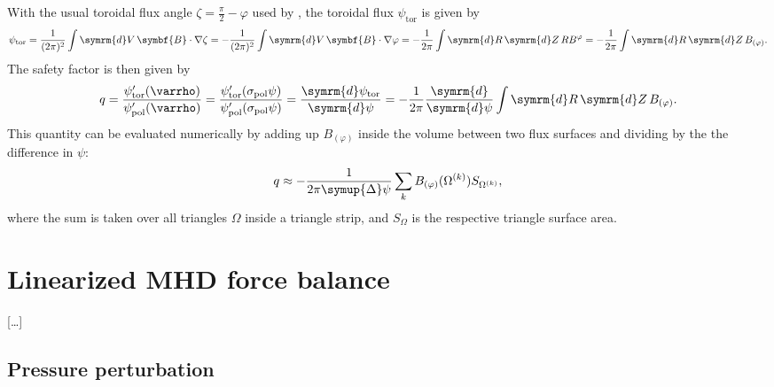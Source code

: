 \documentclass[a4paper, twoside, 10pt, english]{article}
\numberwithin{equation}{section}
\let\temp\varrho
\let\varrho\rho
\let\rho\temp
\let\temp\vartheta
\let\vartheta\theta
\let\theta\temp
\let\temp\varphi
\let\varphi\phi
\let\phi\temp
\let\vec\symbf
\newcommand*\grad{\ensuremath{\nabla}}
\newcommand*\diff{\ensuremath{\symrm{d}}}  %
\newcommand*\td[2][]{\ensuremath{\frac{\diff #1}{\diff #2}}}  %
\newcommand*\pol{\ensuremath{\textrm{pol}}}  %
\newcommand*\tor{\ensuremath{\textrm{tor}}}  %
\begin{document}
With the usual toroidal flux angle $\zeta = \frac{\pi}{2} - \phi$ used by \cite{dHaeseleer91}, the toroidal flux $\psi_{\tor}$ is given by
\begin{gather}
  \psi_{\tor} = \frac{1}{(2 \pi)^{2}} \int \diff V \, \vec{B} \cdot \grad \zeta = -\frac{1}{(2 \pi)^{2}} \int \diff V \, \vec{B} \cdot \grad \phi = -\frac{1}{2 \pi} \int \diff R \, \diff Z \, R B^{\phi} = -\frac{1}{2 \pi} \int \diff R \, \diff Z \, B_{(\phi)}.
\end{gather}
The safety factor is then given by
\begin{gather*}
  q = \frac{\psi_{\tor}' (\rho)}{\psi_{\pol}' (\rho)} = \frac{\psi_{\tor}' (\sigma_{\pol} \psi)}{\psi_{\pol}' (\sigma_{\pol} \psi)} = \td[\psi_{\tor}]{\psi} = -\frac{1}{2 \pi} \td{\psi} \int \diff R \, \diff Z \, B_{(\phi)}.
\end{gather*}
This quantity can be evaluated numerically by adding up $B_{(\phi)}$ inside the volume between two flux surfaces and dividing by the the difference in $\psi$:
\begin{gather}
  q \approx -\frac{1}{2 \pi \symup{\Delta} \psi} \sum_{k} B_{(\phi)} (\Omega^{(k)}) S_{\Omega^{(k)}},
\end{gather}
where the sum is taken over all triangles $\Omega$ inside a triangle strip, and $S_{\Omega}$ is the respective triangle surface area.

\clearpage
\section{Linearized MHD force balance}

[\ldots]

\subsection{Pressure perturbation}
\label{sec:compute_presn}
\end{document}
